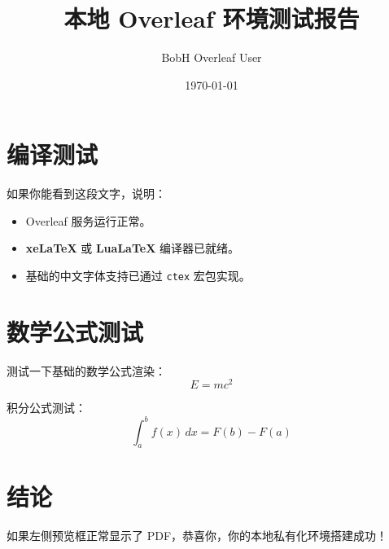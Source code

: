 \documentclass[utf8]{ctexart} %
\title{本地 Overleaf 环境测试报告}
\author{BobH Overleaf User}
\date{\today}
\begin{document}
\maketitle

\section{编译测试}
如果你能看到这段文字，说明：
\begin{itemize}
    \item Overleaf 服务运行正常。
    \item \textbf{xeLaTeX} 或 \textbf{LuaLaTeX} 编译器已就绪。
    \item 基础的中文字体支持已通过 \texttt{ctex} 宏包实现。
\end{itemize}

\section{数学公式测试}
测试一下基础的数学公式渲染：
\begin{equation}
    E = mc^2
\end{equation}

积分公式测试：
\[ \int_{a}^{b} f(x) \,dx = F(b) - F(a) \]

\section{结论}
如果左侧预览框正常显示了 PDF，恭喜你，你的本地私有化环境搭建成功！
\end{document}
